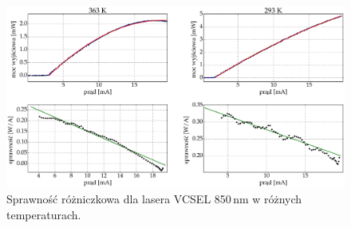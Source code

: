 \begin{figure}
\center
  \includegraphics[scale=0.30]{plot_vcsel_850/plot_eff_2.eps}
  \caption{Sprawność różniczkowa dla lasera VCSEL 850\,nm w różnych temperaturach.}
  \label{vcsel_850_rys_9}
\end{figure}
\newpage
